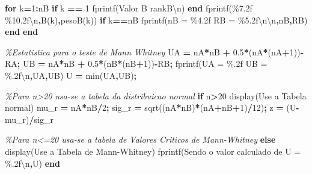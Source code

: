\documentclass[
]{book}
\newenvironment{Shaded}{\begin{snugshade}}{\end{snugshade}}
\newcommand{\CommentTok}[1]{\textcolor[rgb]{0.56,0.35,0.01}{\textit{#1}}}
\newcommand{\ControlFlowTok}[1]{\textcolor[rgb]{0.13,0.29,0.53}{\textbf{#1}}}
\newcommand{\FloatTok}[1]{\textcolor[rgb]{0.00,0.00,0.81}{#1}}
\newcommand{\FunctionTok}[1]{\textcolor[rgb]{0.00,0.00,0.00}{#1}}
\newcommand{\NormalTok}[1]{#1}
\newcommand{\OperatorTok}[1]{\textcolor[rgb]{0.81,0.36,0.00}{\textbf{#1}}}
\newcommand{\StringTok}[1]{\textcolor[rgb]{0.31,0.60,0.02}{#1}}
\begin{document}
\begin{Shaded}
\begin{Highlighting}[]
\ControlFlowTok{for}\NormalTok{ k}\OperatorTok{=}\FloatTok{1}\OperatorTok{:}\NormalTok{nB}
  \ControlFlowTok{if}\NormalTok{ k }\OperatorTok{==} \FloatTok{1}
    \FunctionTok{fprintf}\NormalTok{(}\StringTok{\textquotesingle{}Valor B           rankB\textbackslash{}n\textquotesingle{}}\NormalTok{)}
  \ControlFlowTok{end}
  \FunctionTok{fprintf}\NormalTok{(}\StringTok{\textquotesingle{}\%7.2f     \%10.2f\textbackslash{}n\textquotesingle{}}\OperatorTok{,}\NormalTok{B(k)}\OperatorTok{,}\NormalTok{pesoB(k))}
  \ControlFlowTok{if}\NormalTok{ k}\OperatorTok{==}\NormalTok{nB}
    \FunctionTok{fprintf}\NormalTok{(}\StringTok{\textquotesingle{}nB = \%4.2f     RB = \%5.2f\textbackslash{}n\textbackslash{}n\textquotesingle{}}\OperatorTok{,}\NormalTok{nB}\OperatorTok{,}\NormalTok{RB)}
  \ControlFlowTok{end}
\ControlFlowTok{end}

\CommentTok{\%Estatistica para o teste de Mann Whitney}
\NormalTok{UA }\OperatorTok{=}\NormalTok{ nA}\OperatorTok{*}\NormalTok{nB }\OperatorTok{+} \FloatTok{0.5}\OperatorTok{*}\NormalTok{(nA}\OperatorTok{*}\NormalTok{(nA}\OperatorTok{+}\FloatTok{1}\NormalTok{))}\OperatorTok{{-}}\NormalTok{RA}\OperatorTok{;}
\NormalTok{UB }\OperatorTok{=}\NormalTok{ nA}\OperatorTok{*}\NormalTok{nB }\OperatorTok{+} \FloatTok{0.5}\OperatorTok{*}\NormalTok{(nB}\OperatorTok{*}\NormalTok{(nB}\OperatorTok{+}\FloatTok{1}\NormalTok{))}\OperatorTok{{-}}\NormalTok{RB}\OperatorTok{;}
\FunctionTok{fprintf}\NormalTok{(}\StringTok{\textquotesingle{}UA = \%.2f   UB = \%.2f\textbackslash{}n\textquotesingle{}}\OperatorTok{,}\NormalTok{UA}\OperatorTok{,}\NormalTok{UB)}
\NormalTok{U }\OperatorTok{=} \FunctionTok{min}\NormalTok{(UA}\OperatorTok{,}\NormalTok{UB)}\OperatorTok{;}

\CommentTok{\%Para n\textgreater{}20 usa{-}se a tabela da distribuicao normal}
\ControlFlowTok{if}\NormalTok{ n}\OperatorTok{\textgreater{}}\FloatTok{20}
  \FunctionTok{display}\NormalTok{(}\StringTok{\textquotesingle{}Use a Tabela normal\textquotesingle{}}\NormalTok{)}
\NormalTok{  mu\_r }\OperatorTok{=}\NormalTok{ nA}\OperatorTok{*}\NormalTok{nB}\OperatorTok{/}\FloatTok{2}\OperatorTok{;}
\NormalTok{  sig\_r }\OperatorTok{=} \FunctionTok{sqrt}\NormalTok{((nA}\OperatorTok{*}\NormalTok{nB)}\OperatorTok{*}\NormalTok{(nA}\OperatorTok{+}\NormalTok{nB}\OperatorTok{+}\FloatTok{1}\NormalTok{)}\OperatorTok{/}\FloatTok{12}\NormalTok{)}\OperatorTok{;}
\NormalTok{  z }\OperatorTok{=}\NormalTok{ (U}\OperatorTok{{-}}\NormalTok{mu\_r)}\OperatorTok{/}\NormalTok{sig\_r}
  
\CommentTok{\%Para n\textless{}=20 usa{-}se a tabela de Valores Criticos de Mann{-}Whitney}
\ControlFlowTok{else}
  \FunctionTok{display}\NormalTok{(}\StringTok{\textquotesingle{}Use a Tabela de Mann{-}Whitney\textquotesingle{}}\NormalTok{)}
  \FunctionTok{fprintf}\NormalTok{(}\StringTok{\textquotesingle{}Sendo o valor calculado de U = \%.2f\textbackslash{}n\textquotesingle{}}\OperatorTok{,}\NormalTok{U)}
\ControlFlowTok{end}
\end{Highlighting}
\end{Shaded}
\end{document}
